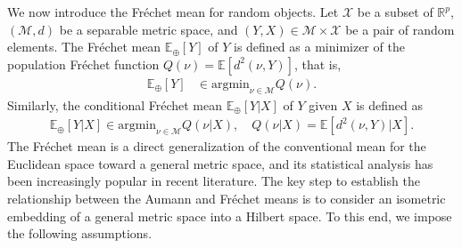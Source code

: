 \documentclass[11pt,reqno]{amsart}
\begin{document}
We now introduce the Fr\'echet mean for random objects. Let $\mathcal{X}$ be a subset of $\mathbb{R}^p$, $(\mathcal{M},d)$ be a separable metric space, and $(Y,X) \in \mathcal{M} \times \mathcal{X}$ be a pair of random elements. The Fr\'echet mean $\mathbb{E}_\oplus[Y]$ of $Y$ is defined as a minimizer of the population Fr\'echet function $Q(\nu)=\mathbb{E}[d^2(\nu,Y)]$, that is,  
\begin{align*}
\mathbb{E}_\oplus[Y] &\in \mathrm{argmin}_{\nu \in \mathcal{M}}Q(\nu).
\end{align*}
Similarly, the conditional Fr\'echet mean $\mathbb{E}_\oplus[Y|X]$ of $Y$ given $X$ is defined as 
\begin{align*}
\mathbb{E}_\oplus[Y|X] \in  \mathrm{argmin}_{\nu \in \mathcal{M}}Q(\nu|X),\quad Q(\nu|X)=\mathbb{E}[d^2(\nu,Y)|X]. 
\end{align*}
The Fr\'echet mean is a direct generalization of the conventional mean for the Euclidean space toward a general metric space, and its statistical analysis has been increasingly popular in recent literature. The key step to establish the relationship between the Aumann and Fr\'echet means is to consider an isometric embedding of a general metric space into a Hilbert space. To this end, we impose the following assumptions.
\end{document}
